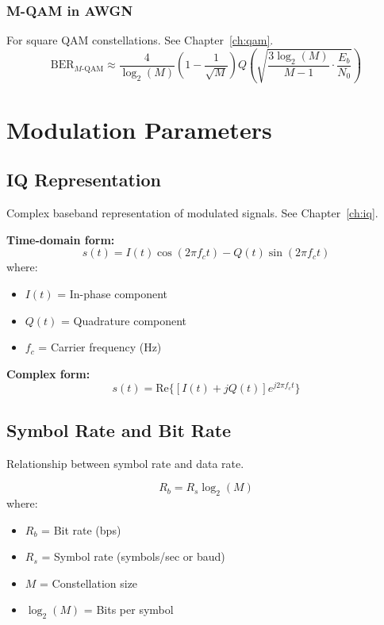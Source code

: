 \subsubsection{M-QAM in AWGN}
For square QAM constellations. See Chapter~\ref{ch:qam}.
\begin{equation}
\text{BER}_{M\text{-QAM}} \approx \frac{4}{\log_2(M)}\left(1 - \frac{1}{\sqrt{M}}\right) Q\left(\sqrt{\frac{3\log_2(M)}{M-1} \cdot \frac{E_b}{N_0}}\right)
\label{eq:ber-mqam}
\end{equation}

\section{Modulation Parameters}
\label{sec:modulation}

\subsection{IQ Representation}
\label{sec:iq-representation}

Complex baseband representation of modulated signals. See Chapter~\ref{ch:iq}.

\textbf{Time-domain form:}
\begin{equation}
s(t) = I(t)\cos(2\pi f_c t) - Q(t)\sin(2\pi f_c t)
\label{eq:iq-time}
\end{equation}
where:
\begin{itemize}
\item $I(t)$ = In-phase component
\item $Q(t)$ = Quadrature component
\item $f_c$ = Carrier frequency (Hz)
\end{itemize}

\textbf{Complex form:}
\begin{equation}
s(t) = \text{Re}\{[I(t) + jQ(t)]e^{j2\pi f_c t}\}
\label{eq:iq-complex}
\end{equation}

\subsection{Symbol Rate and Bit Rate}
\label{sec:symbol-rate}

Relationship between symbol rate and data rate.

\begin{equation}
R_b = R_s \log_2(M)
\label{eq:bit-symbol-rate}
\end{equation}
where:
\begin{itemize}
\item $R_b$ = Bit rate (bps)
\item $R_s$ = Symbol rate (symbols/sec or baud)
\item $M$ = Constellation size
\item $\log_2(M)$ = Bits per symbol
\end{itemize}

